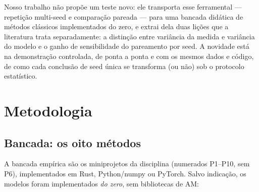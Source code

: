 \documentclass[12pt]{article}
\begin{document}
Nosso trabalho não propõe um teste novo: ele transporta esse ferramental ---
repetição multi-seed \cite{reimers2017,bouthillier2021} e comparação pareada
\cite{dietterich1998,demsar2006} --- para uma bancada didática de métodos
clássicos implementados do zero, e extrai dela duas lições que a literatura
trata separadamente: a distinção entre variância da medida e variância do
modelo \cite{nadeau2003,bouthillier2021} e o ganho de sensibilidade do
pareamento por seed. A novidade está na demonstração controlada, de ponta a
ponta e com os mesmos dados e código, de como cada conclusão de seed única se
transforma (ou não) sob o protocolo estatístico.

\section{Metodologia}\label{sec:met}

\subsection{Bancada: os oito métodos}\label{sec:met-metodos}

A bancada empírica são os miniprojetos da disciplina (numerados P1--P10, sem
P6), implementados em Rust, Python/numpy ou PyTorch. Salvo indicação, os
modelos foram implementados \emph{do zero}, sem bibliotecas de AM:
\end{document}

